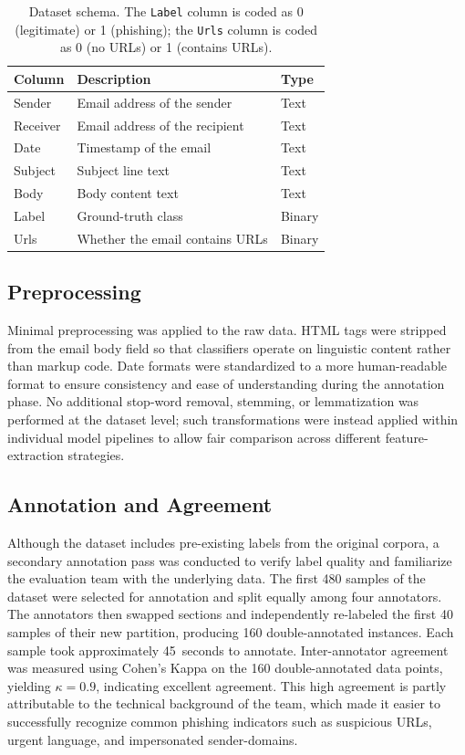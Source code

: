 \documentclass[11pt]{article}
\begin{document}
\begin{table}[h]
\centering
\small
\begin{tabular}{lll}
\hline
\textbf{Column} & \textbf{Description} & \textbf{Type} \\
\hline
Sender   & Email address of the sender    & Text \\
Receiver & Email address of the recipient & Text \\
Date     & Timestamp of the email         & Text \\
Subject  & Subject line text              & Text \\
Body     & Body content text              & Text \\
Label    & Ground-truth class             & Binary \\
Urls     & Whether the email contains URLs & Binary \\
\hline
\end{tabular}
\caption{Dataset schema. The \texttt{Label} column is coded as 0 (legitimate) or 1 (phishing); the \texttt{Urls} column is coded as 0 (no URLs) or 1 (contains URLs).}
\label{tab:dataset-format}
\end{table}

\subsection{Preprocessing}
Minimal preprocessing was applied to the raw data. HTML tags were stripped from the email body field so that classifiers operate on linguistic content rather than markup code. Date formats were standardized to a more human-readable format to ensure consistency and ease of understanding during the annotation phase. No additional stop-word removal, stemming, or lemmatization was performed at the dataset level; such transformations were instead applied within individual model pipelines to allow fair comparison across different feature-extraction strategies.

\subsection{Annotation and Agreement}
Although the dataset includes pre-existing labels from the original corpora, a secondary annotation pass was conducted to verify label quality and familiarize the evaluation team with the underlying data. The first 480 samples of the dataset were selected for annotation and split equally among four annotators. The annotators then swapped sections and independently re-labeled the first 40 samples of their new partition, producing 160 double-annotated instances. Each sample took approximately 45~seconds to annotate. Inter-annotator agreement was measured using Cohen's Kappa on the 160 double-annotated data points, yielding $\kappa = 0.9$, indicating excellent agreement. This high agreement is partly attributable to the technical background of the team, which made it easier to successfully recognize common phishing indicators such as suspicious URLs, urgent language, and impersonated sender-domains.
\end{document}
